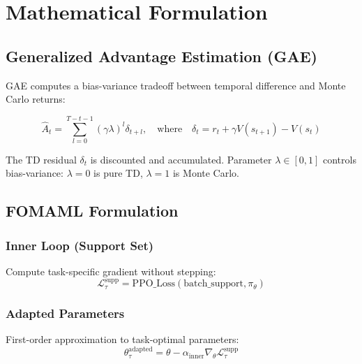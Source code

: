 \documentclass[11pt,a4paper]{article}
\begin{document}
\clearpage


\section{Mathematical Formulation}

\subsection{Generalized Advantage Estimation (GAE)}

GAE computes a bias-variance tradeoff between temporal difference and Monte Carlo returns:

\begin{equation}
\hat{A}_t = \sum_{l=0}^{T-t-1} (\gamma \lambda)^l \delta_{t+l}, \quad \text{where} \quad \delta_t = r_t + \gamma V(s_{t+1}) - V(s_t)
\end{equation}

\noindent
The TD residual $\delta_t$ is discounted and accumulated. Parameter $\lambda \in [0,1]$ controls bias-variance: $\lambda=0$ is pure TD, $\lambda=1$ is Monte Carlo.

\subsection{FOMAML Formulation}

\subsubsection{Inner Loop (Support Set)}
Compute task-specific gradient without stepping:
\begin{equation}
\mathcal{L}_\tau^{\text{supp}} = \text{PPO\_Loss}(\text{batch\_support}, \pi_\theta)
\end{equation}

\subsubsection{Adapted Parameters}
First-order approximation to task-optimal parameters:
\begin{equation}
\theta_\tau^{\text{adapted}} = \theta - \alpha_{\text{inner}} \nabla_\theta \mathcal{L}_\tau^{\text{supp}}
\end{equation}
\end{document}
